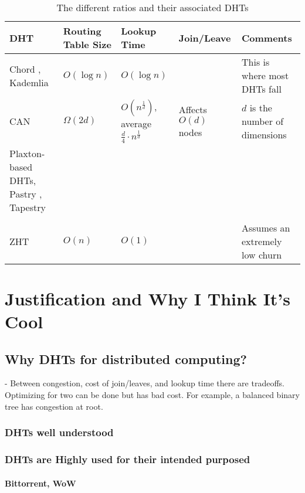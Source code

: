 \documentclass[10pt,letterpaper]{report}
\begin{document}
\begin{table}[h]
	\small
	\centering
	\begin{tabularx}{\textwidth}{ |X|X|X|X|X| }
		\hline
		DHT & Routing Table Size & Lookup Time & Join/Leave & Comments \\ \hline  
		Chord \cite{chord}, Kademlia \cite{kademlia} & $O(\log n)$ & $O(\log n)$ & & This is where most DHTs fall  \\ \hline
		CAN \cite{can} & $\Omega(2d)$ & $O(n^{\frac{1}{d}})$, average $\frac{d}{4}\cdot n^{\frac{1}{d}}$ & Affects $O(d)$ nodes & $d$ is the number of dimensions \\ \hline
		
		Plaxton-based DHTs, Pastry \cite{pastry}, Tapestry \cite{tapestry} &  & & & \\ \hline
		& & & & \\ \hline  
		ZHT \cite{li2013zht}&   $O(n)$& $O(1)$ &  &Assumes an extremely low churn \\ \hline
	\end{tabularx}
	\caption{The different ratios and their associated DHTs}
	\label{tab:tradeoffs}
\end{table}



\chapter{Justification and Why I Think It's Cool}

\section{Why DHTs for distributed computing?}

\cite{malkhi2001viceroy} -  Between congestion, cost of join/leaves, and lookup time there are tradeoffs.  
Optimizing for two can be done but has bad cost.
For example, a balanced binary tree has congestion at root.
\subsection{DHTs well understood}
\subsection{DHTs are Highly used for their intended purposed}
\subsubsection{Bittorrent, WoW}
\end{document}

